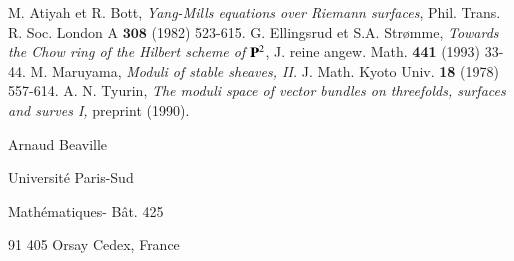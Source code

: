 \begin{thebibliography}{99}
 M. Atiyah et R. Bott, \textit{Yang-Mills equations over Riemann surfaces}, Phil. Trans. R. Soc. London A $\mathbf{308}$ (1982) 523-615.
 G. Ellingsrud et S.A. Str\o mme, \textit{Towards the Chow ring of the Hilbert scheme of} $\mathbf{P}^{2}$, J. reine angew. Math. {\bf 441} (1993) 33-44.
 M. Maruyama, \textit{Moduli of stable sheaves, II.} J. Math. Kyoto Univ. {\bf 18} (1978) 557-614.
 A. N. Tyurin, \textit{The moduli space of vector bundles on threefolds, surfaces and surves I,} preprint (1990).
\end{thebibliography}

\begin{flushleft}
Arnaud Beaville

Universit\'e Paris-Sud

Math\'ematiques- B\^at. 425

91 405 Orsay Cedex, France
\end{flushleft}
